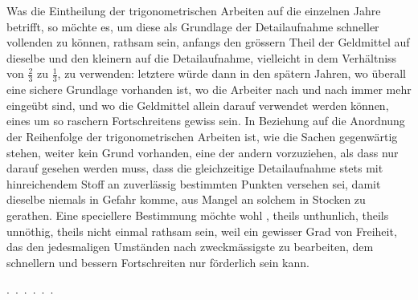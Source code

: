 Was die Eintheilung der trigonometrischen Arbeiten auf die einzelnen
Jahre betrifft, so möchte es, um diese als Grundlage der Detailaufnahme
schneller vollenden zu können, rathsam sein, anfangs den grössern Theil der
Geldmittel auf dieselbe und den kleinern auf die Detailaufnahme, vielleicht
in dem Verhältniss von \(\frac{2}{3}\) zu \(\frac{1}{3}\), zu verwenden: letztere würde dann in den
spätern Jahren, wo überall eine sichere Grundlage vorhanden ist, wo die Arbeiter
nach und nach immer mehr eingeübt sind, und wo die Geldmittel
allein darauf verwendet werden können, eines um so raschern Fortschreitens
gewiss sein. In Beziehung auf die Anordnung der Reihenfolge der trigonometrischen
Arbeiten ist, wie die Sachen gegenwärtig stehen, weiter kein
Grund vorhanden, eine der andern vorzuziehen, als dass nur darauf gesehen
werden muss, dass die gleichzeitige Detailaufnahme stets mit hinreichendem
Stoff an zuverlässig bestimmten Punkten versehen sei, damit dieselbe niemals
in Gefahr komme, aus Mangel an solchem in Stocken zu gerathen. Eine
speciellere Bestimmung möchte wohl , theils unthunlich,
theils unnöthig, theils nicht einmal rathsam sein, weil ein gewisser Grad
von Freiheit, das den jedesmaligen Umständen nach zweckmässigste zu bearbeiten,
dem schnellern und bessern Fortschreiten nur förderlich sein kann.
\par\noindent\mbox{.\ .\ .\ .\ .\ .}\par
\medskip\noindent\hspace*{0.03\linewidth}{\footnotesize IX.}\hfill{}\par
